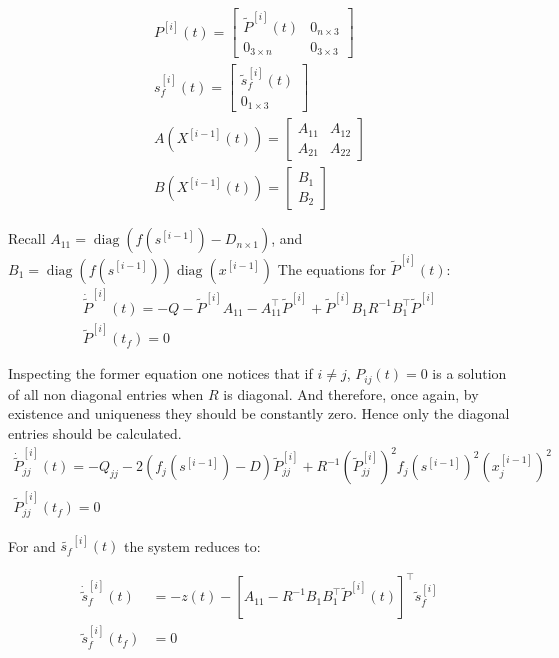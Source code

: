 \documentclass[processes,article,submit,moreauthors,pdftex]{Definitions/mdpi}
\DeclareMathOperator{\diag}{diag}
\begin{document}
\begin{align}
P^{[i]}(t) = \begin{bmatrix}
\tilde{P}^{[i]}(t) & 0_{n\times 3} \\ 0_{3 \times n} & 0_{3 \times 3}
\end{bmatrix} \\
s_f^{[i]}(t) = \begin{bmatrix}
\tilde{s}_f^{[i]}(t) \\ 0_{1\times 3}
\end{bmatrix} \\
A\left (X^{[i-1]}(t)\right) = \begin{bmatrix}
A_{11} & A_{12} \\ A_{21} & A_{22}
\end{bmatrix} \\
B\left (X^{[i-1]}(t)\right) = \begin{bmatrix}
B_1 \\ B_2
\end{bmatrix} 
\end{align}


Recall $A_{11} = \diag \left( f\left(s^{[i-1]}\right)- D_{n\times 1} \right)$, and $B_1 = \diag\left(f\left(s^{[i-1]}\right)\right)\diag \left(x^{[i-1]} \right) $ The equations for $\tilde{P}^{[i]}(t)$:
\begin{align}
\dot{\tilde{P}}^{[i]}(t)= -Q- \tilde{P}^{[i]}A_{11} -A_{11}^\top \tilde{P}^{[i]} +  \tilde{P}^{[i]}B_1R^{-1}B_1^\top \tilde{P}^{[i]} \\
\tilde{P}^{[i]}(t_f) = 0
\end{align}

Inspecting the former equation one notices that if $i\neq j$, $P_{ij}(t) = 0$ is a solution of all non diagonal entries when $R$ is diagonal. And therefore, once again, by existence and uniqueness they should be constantly zero. Hence only the diagonal entries should be calculated. 
\begin{align}
\dot{\tilde{P}}^{[i]}_{jj}(t)= -Q_{jj}- 2 \left(f_j\left(s^{[i-1]}\right)- D \right)\tilde{P}^{[i]}_{jj} + R^{-1}\left(\tilde{P}^{[i]}_{jj}\right)^2f_j\left(s^{[i-1]}\right)^2\left(x^{[i-1]}_j\right)^2  \\
\tilde{P}^{[i]}_{jj}(t_f) = 0
\end{align}

For and  $\tilde{s_f}^{[i]}(t)$ the system reduces to:

\begin{align}
\dot{\tilde{s}}_f^{[i]}(t) &= -z(t)- \left[A_{11} -R^{-1}B_1B_1^\top \tilde{P}^{[i]}(t) \right]^\top \tilde{s}_f^{[i]} \\
\tilde{s}_f^{[i]}(t_f) &= 0
\end{align}
\end{document}
